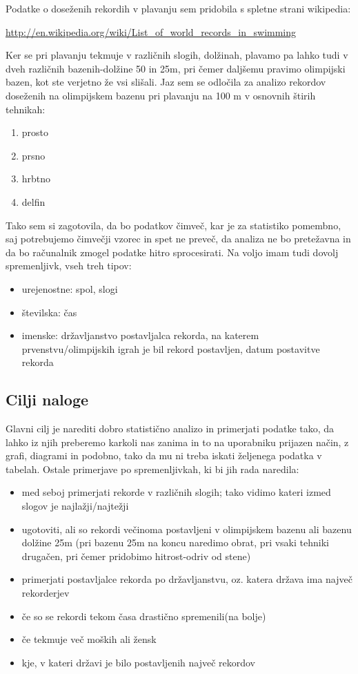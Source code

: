 \documentclass[11pt,a4paper]{article}
\begin{document}
Podatke o doseženih rekordih v plavanju sem pridobila s spletne strani wikipedia:

\url{http://en.wikipedia.org/wiki/List_of_world_records_in_swimming}

Ker se pri plavanju tekmuje v različnih slogih, dolžinah, plavamo pa lahko tudi v dveh različnih bazenih-dolžine 50 in 25m, pri čemer daljšemu pravimo olimpijski bazen, kot ste verjetno že vsi slišali. Jaz sem se odločila za analizo rekordov doseženih na olimpijskem bazenu pri plavanju na 100 m  v osnovnih štirih tehnikah:


\begin{enumerate}
\item prosto
\item prsno
\item hrbtno
\item delfin
\end{enumerate}

Tako sem si zagotovila, da bo podatkov čimveč, kar je za statistiko pomembno, saj potrebujemo čimvečji vzorec in spet ne preveč, da analiza ne bo pretežavna in da bo računalnik zmogel podatke hitro sprocesirati. Na voljo imam tudi dovolj spremenljivk, vseh treh tipov:

\begin{itemize}
\item urejenostne: spol, slogi
\item številska: čas
\item imenske: državljanstvo postavljalca rekorda, na katerem prvenstvu/olimpijskih igrah je bil rekord postavljen, datum postavitve rekorda
\end{itemize}

\subsection{Cilji naloge}


Glavni cilj je narediti dobro statistično analizo in primerjati podatke tako, da lahko iz njih preberemo karkoli nas zanima in to na uporabniku prijazen način, z grafi, diagrami in podobno, tako da mu ni treba iskati željenega podatka v tabelah. Ostale primerjave po spremenljivkah, ki bi jih rada naredila:
\begin{itemize}
\item med seboj primerjati rekorde v različnih slogih; tako vidimo kateri izmed slogov je najlažji/najtežji
\item ugotoviti, ali so rekordi večinoma postavljeni v olimpijskem bazenu ali bazenu dolžine 25m (pri bazenu 25m na koncu naredimo obrat, pri vsaki tehniki drugačen, pri čemer pridobimo hitrost-odriv od stene)
\item primerjati postavljalce rekorda po državljanstvu, oz. katera država ima največ rekorderjev
\item če so se rekordi tekom časa drastično spremenili(na bolje)
\item če tekmuje več moških ali žensk
\item kje, v kateri državi je bilo postavljenih največ rekordov
\end{itemize}
\end{document}
